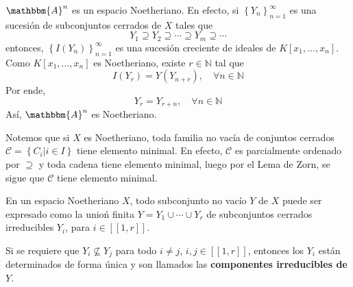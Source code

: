 \documentclass[12pt]{report}
\newcounter{it}
\theoremstyle{largebreak}
\newcommand\natint[1]{\ensuremath{\left[\!\left[ #1\right]\!\right]}}
\newcommand{\bbm}[1]{\ensuremath{\mathbbm{#1}}}
\begin{document}
    \begin{exa}
        $\bbm{A}^n$ es un espacio Noetheriano. En efecto, si $\left\{Y_n \right\}_{ n=1}^\infty$ es una sucesión de subconjuntos cerrados de $X$ tales que
        \begin{equation*}
            Y_1\supseteq Y_2\supseteq\cdots\supseteq Y_m\supseteq\cdots
        \end{equation*}
        entonces, $\left\{I(Y_n) \right\}_{ n=1}^\infty$ es una sucesión creciente de ideales de $K[x_1,...,x_n]$. Como $K[x_1,...,x_n]$  es Noetheriano, existe $r\in\mathbb{N}$ tal que 
        \begin{equation*}
            I(Y_r)=Y(Y_{ n+r}),\quad\forall n\in\mathbb{N}
        \end{equation*}
        Por ende,
        \begin{equation*}
            Y_r=Y_{ r+n},\quad\forall n\in\mathbb{N}
        \end{equation*}
        Así, $\bbm{A}^n$ es Noetheriano.
    \end{exa}

    \begin{obs}
        Notemos que si $X$ es Noetheriano, toda familia no vacía de conjuntos cerrados $\mathcal{C}=\left\{C_i\Big|i\in I \right\}$ tiene elemento minimal. En efecto, $\mathcal{C}$ es parcialmente ordenado por $\supseteq$ y toda cadena tiene elemento minimal, luego por el Lema de Zorn, se sigue que $\mathcal{C}$ tiene elemento minimal.
    \end{obs}

    \begin{propo}
        En un espacio Noetheriano $X$, todo subconjunto no vacío $Y$ de $X$ puede ser expresado como la unioń finita $Y=Y_1\cup\cdots\cup Y_r$ de subconjuntos cerrados irreducibles $Y_i$, para $i\in\natint{1,r}$.

        Si se requiere que $Y_i\nsubseteq Y_j$ para todo $i\neq j$, $i,j\in\natint{1,r}$, entonces los $Y_i$ están determinados de forma única y son llamados las \textbf{componentes irreducibles de $Y$}.
    \end{propo}
\end{document}
